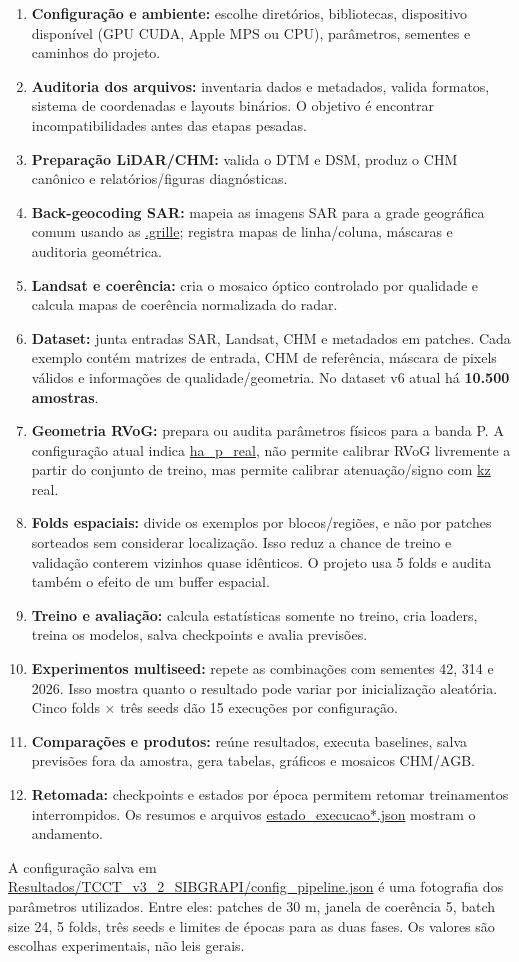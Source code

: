 \documentclass[11pt,a4paper]{article}
\begin{document}
\begin{enumerate}
\item \textbf{Configuração e ambiente:} escolhe diretórios, bibliotecas, dispositivo disponível (GPU CUDA, Apple MPS ou CPU), parâmetros, sementes e caminhos do projeto.
\item \textbf{Auditoria dos arquivos:} inventaria dados e metadados, valida formatos, sistema de coordenadas e layouts binários. O objetivo é encontrar incompatibilidades antes das etapas pesadas.
\item \textbf{Preparação LiDAR/CHM:} valida o DTM e DSM, produz o CHM canônico e relatórios/figuras diagnósticas.
\item \textbf{Back-geocoding SAR:} mapeia as imagens SAR para a grade geográfica comum usando as \url{.grille}; registra mapas de linha/coluna, máscaras e auditoria geométrica.
\item \textbf{Landsat e coerência:} cria o mosaico óptico controlado por qualidade e calcula mapas de coerência normalizada do radar.
\item \textbf{Dataset:} junta entradas SAR, Landsat, CHM e metadados em patches. Cada exemplo contém matrizes de entrada, CHM de referência, máscara de pixels válidos e informações de qualidade/geometria. No dataset v6 atual há \textbf{10.500 amostras}.
\item \textbf{Geometria RVoG:} prepara ou audita parâmetros físicos para a banda P. A configuração atual indica \url{ha_p_real}, não permite calibrar RVoG livremente a partir do conjunto de treino, mas permite calibrar atenuação/signo com \url{kz} real.
\item \textbf{Folds espaciais:} divide os exemplos por blocos/regiões, e não por patches sorteados sem considerar localização. Isso reduz a chance de treino e validação conterem vizinhos quase idênticos. O projeto usa 5 folds e audita também o efeito de um buffer espacial.
\item \textbf{Treino e avaliação:} calcula estatísticas somente no treino, cria loaders, treina os modelos, salva checkpoints e avalia previsões.
\item \textbf{Experimentos multiseed:} repete as combinações com sementes 42, 314 e 2026. Isso mostra quanto o resultado pode variar por inicialização aleatória. Cinco folds × três seeds dão 15 execuções por configuração.
\item \textbf{Comparações e produtos:} reúne resultados, executa baselines, salva previsões fora da amostra, gera tabelas, gráficos e mosaicos CHM/AGB.
\item \textbf{Retomada:} checkpoints e estados por época permitem retomar treinamentos interrompidos. Os resumos e arquivos \url{estado_execucao*.json} mostram o andamento.
\end{enumerate}
A configuração salva em \url{Resultados/TCCT_v3_2_SIBGRAPI/config_pipeline.json} é uma fotografia dos parâmetros utilizados. Entre eles: patches de 30 m, janela de coerência 5, batch size 24, 5 folds, três seeds e limites de épocas para as duas fases. Os valores são escolhas experimentais, não leis gerais.
\end{document}
